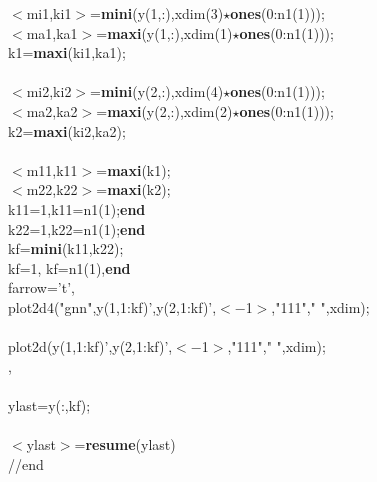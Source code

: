{\begin{flushleft}
{\cmarg \hspace{1.0cm}$<$mi1,ki1$>$={\bf mini}(y(1,:),xdim(3)$\star${\bf ones}(0:n1(1)));\\ 
\cmarg \hspace{1.0cm}$<$ma1,ka1$>$={\bf maxi}(y(1,:),xdim(1)$\star${\bf ones}(0:n1(1)));\\ 
\cmarg \hspace{1.0cm}k1={\bf maxi}(ki1,ka1);\\ 
\cmarg \\ 
\cmarg \hspace{1.0cm}$<$mi2,ki2$>$={\bf mini}(y(2,:),xdim(4)$\star${\bf ones}(0:n1(1)));\\ 
\cmarg \hspace{1.0cm}$<$ma2,ka2$>$={\bf maxi}(y(2,:),xdim(2)$\star${\bf ones}(0:n1(1)));\\ 
\cmarg \hspace{1.0cm}k2={\bf maxi}(ki2,ka2);\\ 
\cmarg \\ 
\cmarg \hspace{1.0cm}$<$m11,k11$>$={\bf maxi}(k1);\\ 
\cmarg \hspace{1.0cm}$<$m22,k22$>$={\bf maxi}(k2);\\ 
\cmarg \hspace{1.0cm}{\bf if} k11=1,k11=n1(1);{\bf end}\\ 
\cmarg \hspace{1.0cm}{\bf if} k22=1,k22=n1(1);{\bf end}\\ 
\cmarg \hspace{1.0cm}kf={\bf mini}(k11,k22);\\ 
\cmarg \hspace{1.0cm}{\bf if} kf=1, kf=n1(1),{\bf end}\\ 
\cmarg \hspace{1.2cm}{\bf if} farrow='t',\\ 
\cmarg \hspace{1.8cm}plot2d4("gnn",y(1,1:kf)',y(2,1:kf)',$<$$-$1$>$,"111"," ",xdim);\\ 
\cmarg \hspace{1.2cm}{\bf else} \\ 
\cmarg \hspace{1.8cm}plot2d(y(1,1:kf)',y(2,1:kf)',$<$$-$1$>$,"111"," ",xdim);\\ 
\cmarg \hspace{1.2cm}{\bf end},\\ 
\cmarg \hspace{1.0cm}{\bf end} \\ 
\cmarg \hspace{1.0cm}ylast=y(:,kf);\\ 
 \\ 
\cmarg $<$ylast$>$={\bf resume}(ylast)\\ 
\cmarg //end }
\end{flushleft}}




